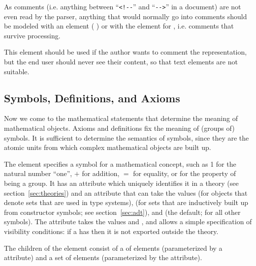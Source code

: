 As {\xml} comments (i.e. anything
between ``{\verb+<!--+}'' and ``{\verb+-->+}'' in a document) are not even read by
the {\xml} parser, anything that
would normally go into comments should be modeled with an {}
element ({} {}) or with the
{} element for {}, i.e.  comments that survive processing.

This element should be used if the author wants to comment the {\omdoc}
representation, but the end user should never see their content, so that {\omdoc}
text elements are not suitable.

\subsection{Symbols, Definitions, and Axioms}\label{sec:definitions}

Now we come to the mathematical statements that determine the meaning of
mathematical objects. Axioms and definitions fix the meaning of (groups of)
symbols. It is sufficient to determine the semantics of symbols, since they are
the atomic units from which complex mathematical objects are built up.

The {{}} element specifies a symbol for a mathematical concept, such
as 1 for the natural number ``one'', $+$ for addition, $=$ for equality, or
{} for the property of being a group. It has an
{} attribute which uniquely identifies it in a theory (see
section~\ref{sec:theories}) and an attribute {} that can
take the values {} (for objects that denote sets that
are used in type systems), {} (for sets that are
inductively built up from constructor symbols; see section~\ref{sec:adt}), and
{} (the default; for all other symbols). The
attribute {} takes the values
{} and {}, and allows a
simple specification of visibility conditions: if a {} has
{} {} then it is not
exported outside the theory.

The children of the {} element consist of a
{} of {} elements (parameterized
by a {} attribute) and a set of {}
elements (parameterized by the {} attribute).

